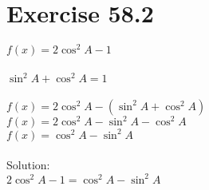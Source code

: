 \documentclass[a4paper, 10pt]{scrartcl}
\begin{document}
\section{Exercise 58.2}

$f(x) = 2 \cos^{2}{A} - 1$\\
\\
$\sin^{2}{A} + \cos^{2}{A} = 1$\\
\\
$f(x) = 2 \cos^{2}{A} - (\sin^{2}{A} + \cos^{2}{A})$\\
$f(x) = 2 \cos^{2}{A} - \sin^{2}{A} - \cos^{2}{A}$\\
$f(x) = \cos^{2}{A} - \sin^{2}{A}$\\
\\
Solution:\\
$2 \cos^{2}{A} - 1 = \cos^{2}{A} - \sin^{2}{A}$\\
\end{document}
